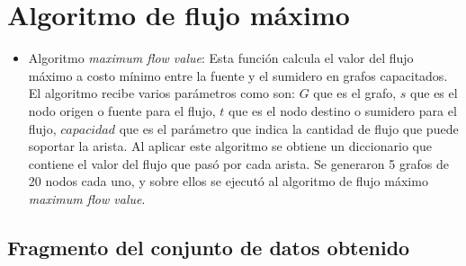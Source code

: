 \documentclass{article}
\begin{document}
\section{Algoritmo de flujo máximo}  

\begin{itemize}
  \item Algoritmo \textit{maximum flow value}: Esta función calcula el valor del flujo máximo a costo mínimo entre la fuente y el sumidero en grafos capacitados. El algoritmo recibe varios parámetros como son: $G$ que es el grafo, $s$ que es el nodo origen o fuente para el flujo, $t$ que es el nodo destino o sumidero para el flujo, $capacidad$ que es el parámetro que indica la cantidad de flujo que puede soportar la arista. Al aplicar este algoritmo se obtiene un diccionario que contiene el valor del flujo que pasó por cada arista. 
  Se generaron 5 grafos de 20 nodos cada uno, y sobre ellos se ejecutó al algoritmo de flujo máximo \textit{maximum flow value}.     
   
\end{itemize}

\subsection{Fragmento del conjunto de datos obtenido}
\end{document}
